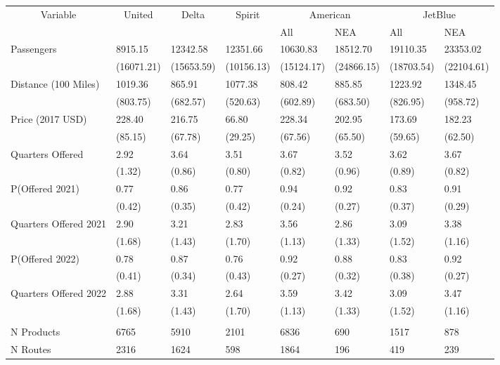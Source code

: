 
\begin{tabular}[t]{llllllll}
\toprule
\multicolumn{1}{c}{Variable} & \multicolumn{1}{c}{United} & \multicolumn{1}{c}{Delta} & \multicolumn{1}{c}{Spirit} & \multicolumn{2}{c}{American} & \multicolumn{2}{c}{JetBlue} \\
\cmidrule(l{3pt}r{3pt}){1-1} \cmidrule(l{3pt}r{3pt}){2-2} \cmidrule(l{3pt}r{3pt}){3-3} \cmidrule(l{3pt}r{3pt}){4-4} \cmidrule(l{3pt}r{3pt}){5-6} \cmidrule(l{3pt}r{3pt}){7-8}
 &  &  &  & All & NEA & All & NEA\\
\midrule
Passengers & 8915.15 & 12342.58 & 12351.66 & 10630.83 & 18512.70 & 19110.35 & 23353.02\\
 & (16071.21) & (15653.59) & (10156.13) & (15124.17) & (24866.15) & (18703.54) & (22104.61)\\
Distance (100 Miles) & 1019.36 & 865.91 & 1077.38 & 808.42 & 885.85 & 1223.92 & 1348.45\\
 & (803.75) & (682.57) & (520.63) & (602.89) & (683.50) & (826.95) & (958.72)\\
Price (2017 USD) & 228.40 & 216.75 & 66.80 & 228.34 & 202.95 & 173.69 & 182.23\\
 & (85.15) & (67.78) & (29.25) & (67.56) & (65.50) & (59.65) & (62.50)\\
Quarters Offered & 2.92 & 3.64 & 3.51 & 3.67 & 3.52 & 3.62 & 3.67\\
 & (1.32) & (0.86) & (0.80) & (0.82) & (0.96) & (0.89) & (0.82)\\
P(Offered 2021) & 0.77 & 0.86 & 0.77 & 0.94 & 0.92 & 0.83 & 0.91\\
 & (0.42) & (0.35) & (0.42) & (0.24) & (0.27) & (0.37) & (0.29)\\
Quarters Offered 2021 & 2.90 & 3.21 & 2.83 & 3.56 & 2.86 & 3.09 & 3.38\\
 & (1.68) & (1.43) & (1.70) & (1.13) & (1.33) & (1.52) & \vphantom{1} (1.16)\\
P(Offered 2022) & 0.78 & 0.87 & 0.76 & 0.92 & 0.88 & 0.83 & 0.92\\
 & (0.41) & (0.34) & (0.43) & (0.27) & (0.32) & (0.38) & (0.27)\\
Quarters Offered 2022 & 2.88 & 3.31 & 2.64 & 3.59 & 3.42 & 3.09 & 3.47\\
 & (1.68) & (1.43) & (1.70) & (1.13) & (1.33) & (1.52) & (1.16)\\
\midrule
\addlinespace[0.3em]
\multicolumn{8}{l}{\textbf{Summary Statistics}}\\
\hspace{1em}N Products & 6765 & 5910 & 2101 & 6836 & 690 & 1517 & 878\\
\hspace{1em}N Routes & 2316 & 1624 & 598 & 1864 & 196 & 419 & 239\\
\bottomrule
\end{tabular}
